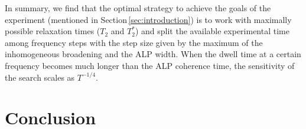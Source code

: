 
In summary, we find that the optimal
strategy to achieve the goals of the experiment (mentioned in Section\,\ref{sec:introduction}) is to work with maximally possible relaxation times ($T_2$ and $T_2^*$) and split the available experimental time among frequency steps with the step size given by the maximum of the inhomogeneous broadening and the ALP width.
When the dwell time at a certain frequency becomes much longer than the ALP coherence time, the sensitivity of the search scales as $T^{-1/4}$.  



\section{Conclusion}

